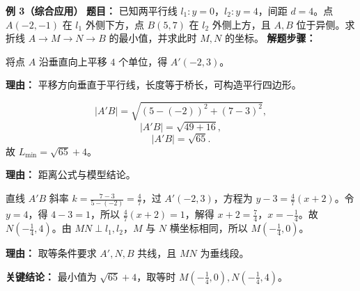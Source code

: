 \begin{examplebox}
	\medskip
	\textbf{\textcolor{CExample}{例 3（综合应用）}}
	\textbf{\textcolor{CExample}{题目：}}
	已知两平行线 $l_1:y=0$，$l_2:y=4$，间距 $d=4$。点 $A(-2,-1)$ 在 $l_1$ 外侧下方，点 $B(5,7)$ 在 $l_2$ 外侧上方，且 $A,B$ 位于异侧。求折线 $A\to M\to N\to B$ 的最小值，并求此时 $M,N$ 的坐标。
	\textbf{\textcolor{CExample}{解题步骤：}}
	\begin{description}[style=nextline, leftmargin=2.8em, labelsep=0.5em, itemsep=0.45em]
		\item[\textbf{第一步（平移构造）：}]
			将点 $A$ 沿垂直向上平移 $4$ 个单位，得 $A'(-2,3)$。
			\par\textbf{理由：} 平移方向垂直于平行线，长度等于桥长，可构造平行四边形。
		\item[\textbf{第二步（距离计算）：}]
			\[
				|A'B| = \sqrt{(5-(-2))^2+(7-3)^2},
			\]
			\[
				|A'B| = \sqrt{49+16},
			\]
			\[
				|A'B| = \sqrt{65}.
			\]
			故 $L_{\min}= \sqrt{65}+4$。
			\par\textbf{理由：} 距离公式与模型结论。
		\item[\textbf{第三步（求取等坐标）：}]
			直线 $A'B$ 斜率 $k=\frac{7-3}{5-(-2)}=\frac{4}{7}$，过 $A'(-2,3)$，方程为 $y-3=\frac{4}{7}(x+2)$。令 $y=4$，得 $4-3=1$，所以 $\frac{4}{7}(x+2)=1$，解得 $x+2=\frac{7}{4}$，$x=-\frac{1}{4}$。故 $N(-\frac{1}{4},4)$。由 $MN\perp l_1,l_2$，$M$ 与 $N$ 横坐标相同，所以 $M(-\frac{1}{4},0)$。
			\par\textbf{理由：} 取等条件要求 $A',N,B$ 共线，且 $MN$ 为垂线段。
	\end{description}
	\textbf{\textcolor{CExample}{关键结论：}}
	最小值为 $\sqrt{65}+4$，取等时 $M(-\frac{1}{4},0), N(-\frac{1}{4},4)$。
\end{examplebox}
